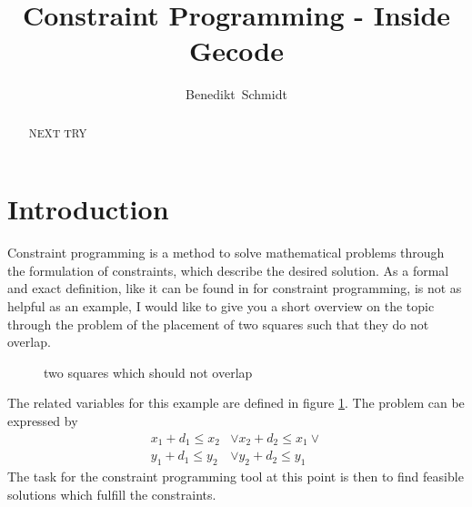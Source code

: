 \documentclass[10pt,
               a4paper,
               journal,
               ]{IEEEtran}
\makeatletter
\def\markboth#1#2{\def\leftmark{\@IEEEcompsoconly{\sffamily}\MakeUppercase{\protect#1}}%
\def\rightmark{\@IEEEcompsoconly{\sffamily}\MakeUppercase{\protect#2}}}
\newcommand{\reffig}[1]{{figure \ref{#1}}}
\makeatother
\begin{document}
	\title{Constraint Programming - Inside Gecode}
	\author{Benedikt~Schmidt}
	\markboth{Advanced Seminar for Security in Information Technology, Summer Term 2014}%
	{Benedikt Schmidt: Constraint Programming - Inside Gecode}	
	\maketitle	
	
	\begin{abstract}	
		NEXT TRY
	\end{abstract}
	
	\section{Introduction}
	Constraint programming is a method to solve mathematical problems through the formulation of constraints, which describe the desired solution. As a formal and exact definition, like it can be found in \cite[p.~16]{handbookCP} for constraint programming, is not as helpful as an example, I would like to give you a short overview on the topic through the problem of the placement of two squares such that they do not overlap.	
	
	\begin{figure}
		\center
		\caption{two squares which should not overlap}
		\label{fig:squares}
	\end{figure}
	
	The related variables for this example are defined in \reffig{fig:squares}. The problem can be expressed by \cite[p. 101]{programmingGecode}
	\begin{equation}
	\begin{split}
		x_1 + d_1 \le x_2 & \lor x_2 + d_2 \le x_1 \lor \\
		y_1 + d_1 \le y_2 & \lor y_2 + d_2 \le y_1
	\end{split}
	\label{eq:squares}
	\end{equation}
	The task for the constraint programming tool at this point is then to find feasible solutions which fulfill the constraints.
	
\end{document}
